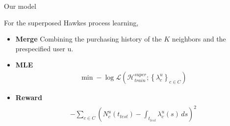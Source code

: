 \documentclass{beamer}
\begin{document}
\begin{frame}{Our model}


For the superposed Hawkes process learning,
\begin{itemize}
    \item \textbf{Merge}  Combining the purchasing history of the $K$ neighbors and the prespecified user u.
    \item \textbf{MLE} 
    \begin{align*}
      \min - \log \mathcal{L} (\mathcal{H}_{train}^{super}; \left\{\lambda_c^u \right\}_{c \in C}) 
    \end{align*}
    \item \textbf{Reward} 
    \begin{align*}
        \begin{matrix}
            - \sum_{c \in C} \left(N_c^u(t_{test}) - \int_{t_{test}} \lambda_c^u(s) \, ds \right)^2
        \end{matrix}
    \end{align*}
    
\end{itemize}


\end{frame}
\end{document}
